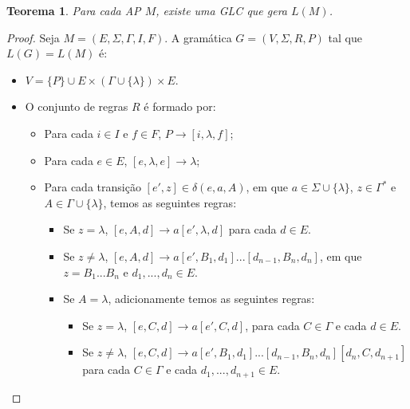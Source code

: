 \documentclass[a4paper]{article}
\newtheorem{Theorem}{Teorema}
\theoremstyle{definition}
\begin{document}
  \begin{Theorem}\label{thmglcap}
    Para cada AP $M$, existe uma GLC que gera $L(M)$.
  \end{Theorem}
  \begin{proof}
    Seja $M = (E,\Sigma,\Gamma,I,F)$. A gramática $G = (V,\Sigma,R,P)$ tal que
    $L(G) = L(M)$ é:
    \begin{itemize}
      \item $V = \{P\} \cup E \times (\Gamma \cup \{\lambda\}) \times E$.
      \item O conjunto de regras $R$ é formado por:
        \begin{itemize}
           \item Para cada $i \in I$ e $f \in F$, $P \to [i,\lambda,f]$;
           \item Para cada $e\in E$, $[e,\lambda,e] \to \lambda$;
           \item Para cada transição $[e',z] \in \delta(e, a, A)$, em que $a\in
             \Sigma\cup\{\lambda\}$, $z\in \Gamma^*$ e $A \in \Gamma \cup
             \{\lambda\}$, temos as seguintes regras:
             \begin{itemize}
               \item Se $z = \lambda$, $[e,A,d] \to a[e',\lambda,d]$ para cada
                 $d \in E$.
               \item Se $z\neq \lambda$, $[e,A,d] \to a[e', B_1,
                 d_1]...[d_{n-1},B_n,d_n]$, em que $z = B_1...B_n$ e
                 $d_1,...,d_n \in E$.
               \item Se $A = \lambda$, adicionamente temos as seguintes regras:
                 \begin{itemize}
                   \item Se $z = \lambda$, $[e,C,d] \to a[e',C,d]$, para cada $C \in \Gamma$ e
                     cada $d \in E$.
                   \item Se $z \neq \lambda$, $[e,C,d] \to a[e',B_1,d_1]...[d_{n
                       - 1},B_n,d_n][d_n,C,d_{n + 1}]$ para cada $C \in \Gamma$ e
                    cada $d_1,...,d_{n+1} \in E$.
                 \end{itemize}
             \end{itemize}
        \end{itemize}
    \end{itemize}
  \end{proof}
\end{document}
